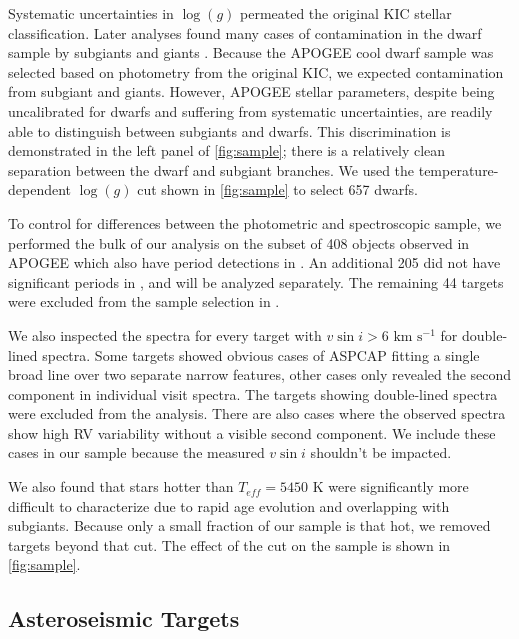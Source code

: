 \documentclass[manuscript]{aastex6}
\newcommand{\vsini}{\ensuremath{v \sin i}}
\newcommand{\Teff}{\ensuremath{T_{eff}}}
\newcommand{\logg}{\ensuremath{\log(g)}}
\newcommand{\kms}{\textrm{ km~s}\ensuremath{^{-1}}}
\begin{document}
Systematic uncertainties in \logg{} permeated the original KIC stellar
classification. Later analyses found many cases of contamination in the dwarf 
sample by subgiants 
and giants \citep{Mann12,Gaidos13}. Because the APOGEE cool dwarf sample was 
selected based on photometry from the original KIC, we expected contamination 
from subgiant and giants. However, APOGEE stellar parameters, 
despite being uncalibrated for dwarfs and suffering from 
systematic uncertainties, are readily able to distinguish between subgiants and 
dwarfs. This discrimination is demonstrated in the left panel of 
\cref{fig:sample}; there is a relatively clean separation between the dwarf 
and subgiant branches. We used the temperature-dependent \logg{} cut shown in 
\cref{fig:sample} to select 657 dwarfs. 

To control for differences between the photometric and spectroscopic sample,
we performed the bulk of our analysis on the subset of 408 objects
observed in APOGEE which also have period detections in \citet{McQuillan14}.
An additional 205 did not have significant periods in \citet{McQuillan14}, and
will be analyzed separately. The remaining 44 targets were excluded from the
sample selection in \citet{McQuillan14}. 

We also inspected the spectra for every target with \(\vsini > 6 \kms\)
for double-lined spectra. Some targets showed obvious cases of ASPCAP fitting 
a single broad line over two separate narrow features, other cases only revealed the
second component in individual visit spectra. The targets showing double-lined
spectra were excluded from the analysis. There are
also cases where the observed spectra show high RV variability
without a visible second component. We include these cases in our sample
because the measured \vsini{} shouldn't be impacted.


We also found that stars hotter than
\(\Teff = 5450\) K were significantly more difficult to characterize due to
rapid age evolution and overlapping with subgiants. Because only a small 
fraction of our sample is that hot, we removed targets beyond that cut. The
effect of the cut on the sample is shown in \cref{fig:sample}.

\subsection{Asteroseismic Targets}
\end{document}
